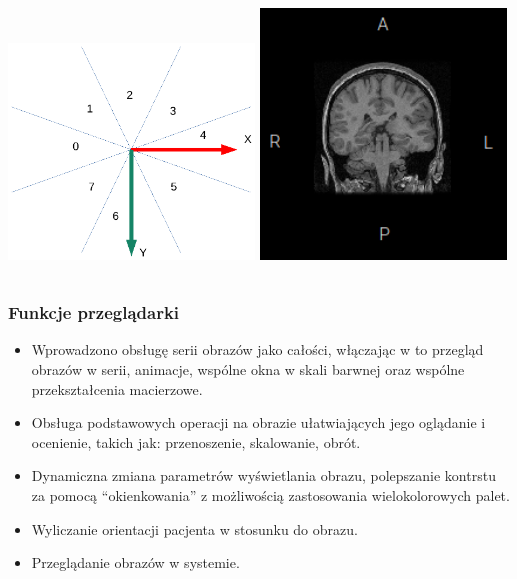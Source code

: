 \documentclass[aspectratio=169]{beamer}
\begin{document}
\begin{frame}[t]
\begin{columns}[t]
        \includegraphics[width=0.49\textwidth]{img/imageorientationindicator-004.pdf}
        \includegraphics[width=0.49\textwidth]{img/imageorientationindicator-005.png}
    \end{columns}
\end{frame}

\begin{frame}
    \frametitle{Funkcje przeglądarki}
    \begin{itemize}
        \item Wprowadzono obsługę serii obrazów jako całości, włączając w to przegląd obrazów w serii, animacje, wspólne okna w skali barwnej oraz wspólne przekształcenia macierzowe.
        \item Obsługa podstawowych operacji na obrazie ułatwiających jego oglądanie i ocenienie, takich jak: przenoszenie, skalowanie, obrót.
        \item Dynamiczna zmiana parametrów wyświetlania obrazu, polepszanie kontrstu za pomocą \enquote{okienkowania} z możliwością zastosowania wielokolorowych palet.
        \item Wyliczanie orientacji pacjenta w stosunku do obrazu.
        \item Przeglądanie obrazów w systemie.
    \end{itemize}
\end{frame}
\end{document}
